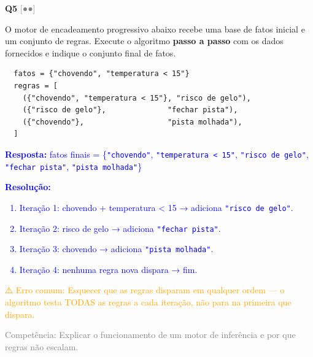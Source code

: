 \documentclass[12pt,a4paper]{article}
\newcommand{\sol}[1]{\textcolor{blue}{#1}}
\newcommand{\errocomum}[1]{\textcolor{orange}{⚠️ Erro comum: #1}}
\newcommand{\competencia}[1]{\textcolor{gray}{Competência: #1}}
\newcommand{\sol}[1]{}
\newcommand{\errocomum}[1]{}
\newcommand{\competencia}[1]{}
\newcommand{\sol}[1]{}
\newcommand{\errocomum}[1]{}
\newcommand{\competencia}[1]{}
\newcommand{\nivel}[1]{\textcolor{gray}{[#1]}}
\newenvironment{questao}[2]{
  \vspace{0.5cm}
  \noindent\textbf{Q#1} \nivel{#2} \quad
}{
  \vspace{0.2cm}
}
\begin{document}
\begin{questao}{5}{●●}
  O motor de encadeamento progressivo abaixo recebe uma base de fatos inicial
  e um conjunto de regras. Execute o algoritmo \textbf{passo a passo} com os
  dados fornecidos e indique o conjunto final de fatos.

  \begin{verbatim}
  fatos = {"chovendo", "temperatura < 15"}
  regras = [
    ({"chovendo", "temperatura < 15"}, "risco de gelo"),
    ({"risco de gelo"},              "fechar pista"),
    ({"chovendo"},                   "pista molhada"),
  ]
  \end{verbatim}

  \sol{
    \textbf{Resposta:} fatos finais = \{\texttt{"chovendo"}, \texttt{"temperatura < 15"},
    \texttt{"risco de gelo"}, \texttt{"fechar pista"}, \texttt{"pista molhada"}\}

    \textbf{Resolução:}
    \begin{enumerate}[nosep]
      \item Iteração 1: chovendo + temperatura < 15 → adiciona \texttt{"risco de gelo"}.
      \item Iteração 2: risco de gelo → adiciona \texttt{"fechar pista"}.
      \item Iteração 3: chovendo → adiciona \texttt{"pista molhada"}.
      \item Iteração 4: nenhuma regra nova dispara → fim.
    \end{enumerate}

    \errocomum{Esquecer que as regras disparam em qualquer ordem — o algoritmo testa TODAS
    as regras a cada iteração, não para na primeira que dispara.}

    \competencia{Explicar o funcionamento de um motor de inferência e por que regras
    não escalam.}
  }
\end{questao}
\end{document}
